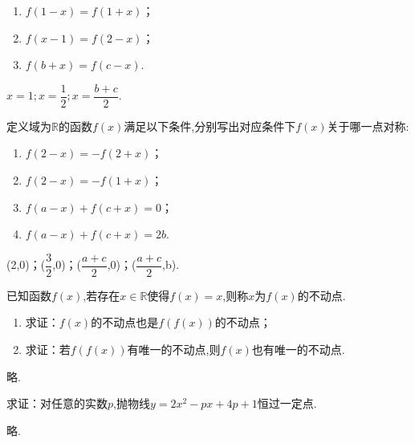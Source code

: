 \documentclass[lang=cn,newtx,10pt,scheme=chinese]{elegantbook}
\begin{document}
\begin{enumerate}
  \item $f(1-x)=f(1+x)$；
  \item $f(x-1)=f(2-x)$；
  \item $f(b+x)=f(c-x)$.
\end{enumerate}

\begin{solution}
  $x=1;x=\dfrac12;x=\dfrac{b+c}{2}.$
\end{solution}

\begin{exercise}
  定义域为$\mathbb{R}$的函数$f(x)$满足以下条件,分别写出对应条件下$f(x)$关于哪一点对称:
\end{exercise}

\begin{enumerate}
  \item $f(2-x)=-f(2+x)$；
  \item $f(2-x)=-f(1+x)$；
  \item $f(a-x)+f(c+x)=0$；
  \item $f(a-x)+f(c+x)=2b$.
\end{enumerate}

\begin{spacing}{1.8}
  \begin{solution}
    (2,0)；($\dfrac32$,0)；($\dfrac{a+c}{2}$,0)；($\dfrac{a+c}{2}$,b).
  \end{solution}
\end{spacing}

\begin{exercise}
  已知函数$f(x)$,若存在$x\in\mathbb{R}$使得$f(x)=x$,则称$x$为$f(x)$的不动点.
\end{exercise}

\begin{enumerate}
  \item 求证：$f(x)$的不动点也是$f(f(x))$的不动点；
  \item 求证：若$f(f(x))$有唯一的不动点,则$f(x)$也有唯一的不动点.
\end{enumerate}

\begin{solution}
  略.
\end{solution}

\begin{exercise}\label{ASJC_G1_P22.5}
  求证：对任意的实数$p$,抛物线$y=2x^2-px+4p+1$恒过一定点.
\end{exercise}

\begin{solution}
  略.
\end{solution}
\end{document}
